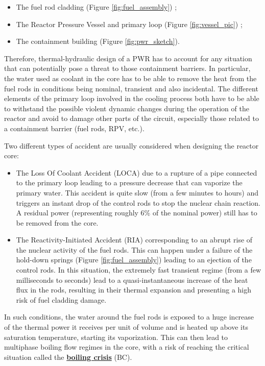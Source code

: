 \begin{itemize}
\item The fuel rod cladding (Figure \ref{fig:fuel_assembly}) ;
\item The Reactor Pressure Vessel and primary loop (Figure \ref{fig:vessel_pic}) ;
\item The containment building (Figure \ref{fig:pwr_sketch}).
\end{itemize}


Therefore, thermal-hydraulic design of a PWR has to account for any situation that can potentially pose a threat to those containment barriers. In particular, the water used as coolant in the core has to be able to remove the heat from the fuel rods in conditions being nominal, transient and also incidental. The different elements of the primary loop involved in the cooling process both have to be able to withstand the possible violent dynamic changes during the operation of the reactor and avoid to damage other parts of the circuit, especially those related to a containment barrier (fuel rods, RPV, etc.).


\npar

Two different types of accident are usually considered when designing the reactor core:

\begin{itemize}
\item The Loss Of Coolant Accident (LOCA) due to a rupture of a pipe connected to the primary loop leading to a pressure decrease that can vaporize the primary water. This accident is quite slow (from a few minutes to hours) and triggers an instant drop of the control rods to stop the nuclear chain reaction. A residual power (representing roughly 6\% of the nominal power) still has to be removed from the core.

\item The Reactivity-Initiated Accident (RIA) corresponding to an abrupt rise of the nuclear activity of the fuel rods. This can happen under a failure of the hold-down springs (Figure \ref{fig:fuel_assembly}) leading to an ejection of the control rods. In this situation, the extremely fast transient regime (from a few milliseconds to seconds) lead to a quasi-instantaneous increase of the heat flux in the rods, resulting in their thermal expansion and presenting a high risk of fuel cladding damage. 
\end{itemize}


In such conditions, the water around the fuel rods is exposed to a huge increase of the thermal power it receives per unit of volume and is heated up above its saturation temperature, starting its vaporization. This can then lead to multiphase boiling flow regimes in the core, with a risk of reaching the critical situation called the \textbf{\underline{boiling crisis}} (BC).

